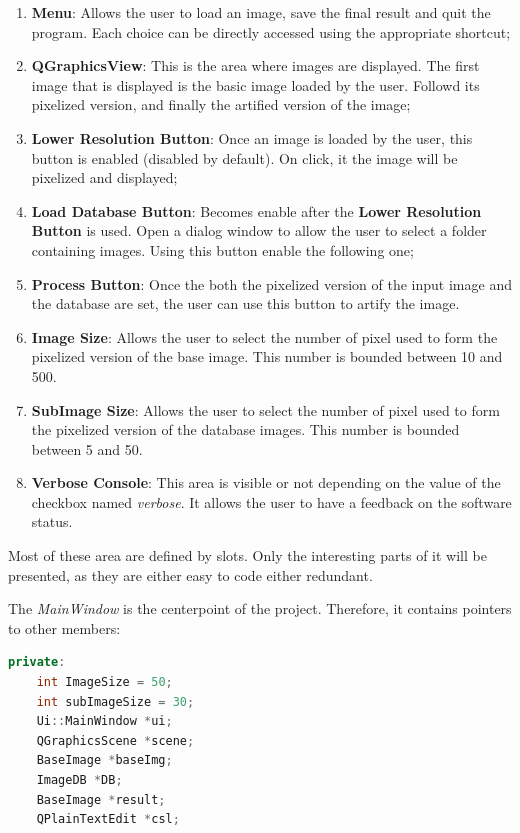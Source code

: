\documentclass[aps,letterpaper,11pt]{revtex4}
\begin{document}
\begin{enumerate}
  \item \textbf{Menu}: Allows the user to load an image, save the final result and quit the program. Each choice can be directly accessed using the appropriate shortcut;
  \item \textbf{QGraphicsView}: This is the area where images are displayed. The first image that is displayed is the basic image loaded by the user. Followd its pixelized version, and finally the artified version of the image;
  \item\textbf{Lower Resolution Button}: Once an image is loaded by the user, this button is enabled (disabled by default). On click, it the image will be pixelized and displayed;
  \item \textbf{Load Database Button}: Becomes enable after the \textbf{Lower Resolution Button} is used. Open a dialog window to allow the user to select a folder containing images. Using this button enable the following one;
  \item \textbf{Process Button}: Once the both the pixelized version of the input image and the database are set, the user can use this button to artify the image.
  \item \textbf{Image Size}: Allows the user to select the number of pixel used to form the pixelized version of the base image. This number is bounded between 10 and 500.
  \item \textbf{SubImage Size}: Allows the user to select the number of pixel used to form the pixelized version of the database images. This number is bounded between 5 and 50.
  \item \textbf{Verbose Console}: This area is visible or not depending on the value of the checkbox named \textit{verbose}. It allows the user to have a feedback on the software status.
\end{enumerate}
Most of these area are defined by slots. Only the interesting parts of it will be presented, as they are either easy to code either redundant.

The \textit{MainWindow} is the centerpoint of the project. Therefore, it contains pointers to other members:

\begin{lstlisting}[language=C++]
private:
    int ImageSize = 50;
    int subImageSize = 30;
    Ui::MainWindow *ui;
    QGraphicsScene *scene;
    BaseImage *baseImg;
    ImageDB *DB;
    BaseImage *result;
    QPlainTextEdit *csl;
\end{lstlisting}
 
\end{document}
